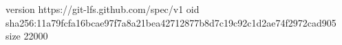 version https://git-lfs.github.com/spec/v1
oid sha256:11a79fcfa16bcae97f7a8a21bea42712877b8d7c19c92c1d2ae74f2972cad905
size 22000
